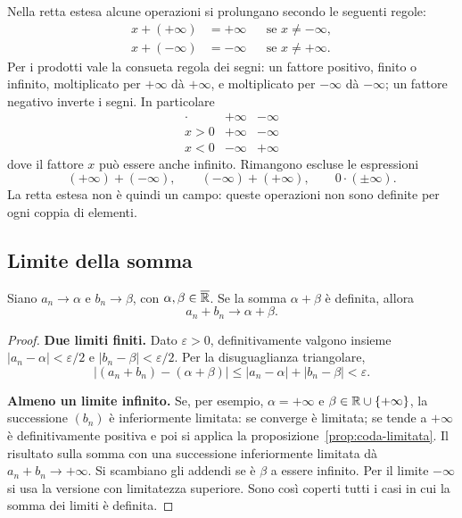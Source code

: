 Nella retta estesa alcune operazioni si prolungano secondo le seguenti regole:
\[
\begin{aligned}
x+(+\infty)&=+\infty &&\text{se }x\ne-\infty,\\
x+(-\infty)&=-\infty &&\text{se }x\ne+\infty.
\end{aligned}
\]
Per i prodotti vale la consueta regola dei segni: un fattore positivo, finito o infinito, moltiplicato per $+\infty$ dà $+\infty$, e moltiplicato per $-\infty$ dà $-\infty$; un fattore negativo inverte i segni. In particolare
\[
\begin{array}{c|cc}
\cdot & +\infty & -\infty\\ \hline
x>0 & +\infty & -\infty\\
x<0 & -\infty & +\infty
\end{array}
\]
dove il fattore $x$ può essere anche infinito. Rimangono escluse le espressioni
\[
(+\infty)+(-\infty),\qquad (-\infty)+(+\infty),
\qquad 0\cdot(\pm\infty).
\]
La retta estesa non è quindi un campo: queste operazioni non sono definite per ogni coppia di elementi.

\subsection{Limite della somma}

\begin{teorema}
Siano $a_n\to\alpha$ e $b_n\to\beta$, con $\alpha,\beta\in\overline{\mathbb{R}}$. Se la somma $\alpha+\beta$ è definita, allora
\[
a_n+b_n\longrightarrow\alpha+\beta.
\]
\end{teorema}
\begin{proof}
\textbf{Due limiti finiti.} Dato $\varepsilon>0$, definitivamente valgono insieme $|a_n-\alpha|<\varepsilon/2$ e $|b_n-\beta|<\varepsilon/2$. Per la disuguaglianza triangolare,
\[
|(a_n+b_n)-(\alpha+\beta)|
\le|a_n-\alpha|+|b_n-\beta|<\varepsilon.
\]

\textbf{Almeno un limite infinito.} Se, per esempio, $\alpha=+\infty$ e $\beta\in\mathbb{R}\cup\{+\infty\}$, la successione $(b_n)$ è inferiormente limitata: se converge è limitata; se tende a $+\infty$ è definitivamente positiva e poi si applica la proposizione~\ref{prop:coda-limitata}. Il risultato sulla somma con una successione inferiormente limitata dà $a_n+b_n\to+\infty$. Si scambiano gli addendi se è $\beta$ a essere infinito. Per il limite $-\infty$ si usa la versione con limitatezza superiore. Sono così coperti tutti i casi in cui la somma dei limiti è definita.
\end{proof}

